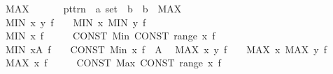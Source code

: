 \begin{isabellebody}
\ \ {\isachardoublequoteopen}{\isacharunderscore}{\kern0pt}MAX{\isachardoublequoteclose}\ \ \ \ \ \ {\isacharcolon}{\kern0pt}{\isacharcolon}{\kern0pt}\ {\isachardoublequoteopen}pttrn\ {\isasymRightarrow}\ {\isacharprime}{\kern0pt}a\ set\ {\isasymRightarrow}\ {\isacharprime}{\kern0pt}b\ {\isasymRightarrow}\ {\isacharprime}{\kern0pt}b{\isachardoublequoteclose}\ \ {\isacharparenleft}{\kern0pt}{\isachardoublequoteopen}{\isacharparenleft}{\kern0pt}{}MAX\ {\isacharunderscore}{\kern0pt}{\isasymin}{\isacharunderscore}{\kern0pt}{\isachardot}{\kern0pt}{\isacharslash}{\kern0pt}\ {\isacharunderscore}{\kern0pt}{\isacharparenright}{\kern0pt}{\isachardoublequoteclose}\ {\isacharbrackleft}{\kern0pt}{}{\isacharcomma}{\kern0pt}\ {}{\isacharcomma}{\kern0pt}\ {}{}{\isacharbrackright}{\kern0pt}\ {}{}{\isacharparenright}{\kern0pt}\isanewline
\isanewline
{}\isamarkupfalse%
\isanewline
\ \ {\isachardoublequoteopen}MIN\ x\ y{\isachardot}{\kern0pt}\ f{\isachardoublequoteclose}\ \ \ {\isasymrightleftharpoons}\ {\isachardoublequoteopen}MIN\ x{\isachardot}{\kern0pt}\ MIN\ y{\isachardot}{\kern0pt}\ f{\isachardoublequoteclose}\isanewline
\ \ {\isachardoublequoteopen}MIN\ x{\isachardot}{\kern0pt}\ f{\isachardoublequoteclose}\ \ \ \ \ {\isasymrightleftharpoons}\ {\isachardoublequoteopen}CONST\ Min\ {\isacharparenleft}{\kern0pt}CONST\ range\ {\isacharparenleft}{\kern0pt}{\isasymlambda}x{\isachardot}{\kern0pt}\ f{\isacharparenright}{\kern0pt}{\isacharparenright}{\kern0pt}{\isachardoublequoteclose}\isanewline
\ \ {\isachardoublequoteopen}MIN\ x{\isasymin}A{\isachardot}{\kern0pt}\ f{\isachardoublequoteclose}\ \ \ {\isasymrightleftharpoons}\ {\isachardoublequoteopen}CONST\ Min\ {\isacharparenleft}{\kern0pt}{\isacharparenleft}{\kern0pt}{\isasymlambda}x{\isachardot}{\kern0pt}\ f{\isacharparenright}{\kern0pt}\ {\isacharbackquote}{\kern0pt}\ A{\isacharparenright}{\kern0pt}{\isachardoublequoteclose}\isanewline
\ \ {\isachardoublequoteopen}MAX\ x\ y{\isachardot}{\kern0pt}\ f{\isachardoublequoteclose}\ \ \ {\isasymrightleftharpoons}\ {\isachardoublequoteopen}MAX\ x{\isachardot}{\kern0pt}\ MAX\ y{\isachardot}{\kern0pt}\ f{\isachardoublequoteclose}\isanewline
\ \ {\isachardoublequoteopen}MAX\ x{\isachardot}{\kern0pt}\ f{\isachardoublequoteclose}\ \ \ \ \ {\isasymrightleftharpoons}\ {\isachardoublequoteopen}CONST\ Max\ {\isacharparenleft}{\kern0pt}CONST\ range\ {\isacharparenleft}{\kern0pt}{\isasymlambda}x{\isachardot}{\kern0pt}\ f{\isacharparenright}{\kern0pt}{\isacharparenright}{\kern0pt}{\isachardoublequoteclose}\isanewline

\end{isabellebody}
